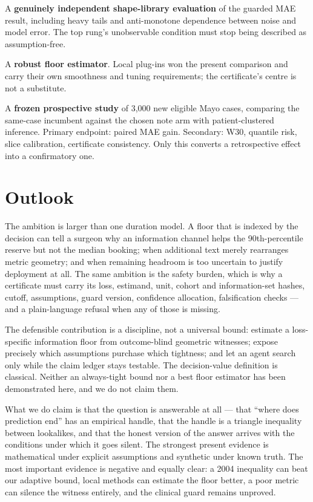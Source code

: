\documentclass[11pt,a4paper]{article}
\begin{document}
A \textbf{genuinely independent shape-library evaluation} of the guarded MAE result, including heavy tails and anti-monotone dependence between noise and model error. The top rung's unobservable condition must stop being described as assumption-free.

A \textbf{robust floor estimator}. Local plug-ins won the present comparison and carry their own smoothness and tuning requirements; the certificate's centre is not a substitute.

A \textbf{frozen prospective study} of 3{,}000 new eligible Mayo cases, comparing the same-case incumbent against the chosen note arm with patient-clustered inference. Primary endpoint: paired MAE gain. Secondary: W30, quantile risk, slice calibration, certificate consistency. Only this converts a retrospective effect into a confirmatory one.

\section{Outlook}

The ambition is larger than one duration model. A floor that is indexed by the decision can tell a surgeon why an information channel helps the 90th-percentile reserve but not the median booking; when additional text merely rearranges metric geometry; and when remaining headroom is too uncertain to justify deployment at all. The same ambition is the safety burden, which is why a certificate must carry its loss, estimand, unit, cohort and information-set hashes, cutoff, assumptions, guard version, confidence allocation, falsification checks --- and a plain-language refusal when any of those is missing.

The defensible contribution is a discipline, not a universal bound: estimate a loss-specific information floor from outcome-blind geometric witnesses; expose precisely which assumptions purchase which tightness; and let an agent search only while the claim ledger stays testable. The decision-value definition is classical. Neither an always-tight bound nor a best floor estimator has been demonstrated here, and we do not claim them.

What we do claim is that the question is answerable at all --- that ``where does prediction end'' has an empirical handle, that the handle is a triangle inequality between lookalikes, and that the honest version of the answer arrives with the conditions under which it goes silent. The strongest present evidence is mathematical under explicit assumptions and synthetic under known truth. The most important evidence is negative and equally clear: a 2004 inequality can beat our adaptive bound, local methods can estimate the floor better, a poor metric can silence the witness entirely, and the clinical guard remains unproved.
\end{document}

